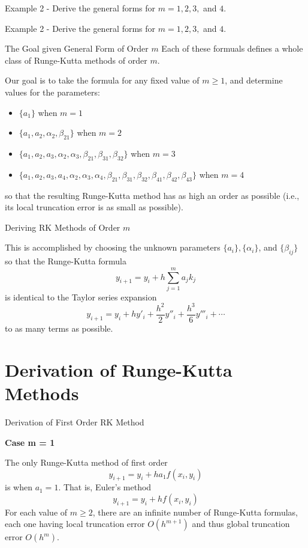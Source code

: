 \documentclass[12pt]{beamer}
\begin{document}
\begin{frame}{Example 2 - Derive the general forms for $m=1,2,3,$ and $4$.}
\end{frame}

\begin{frame}{Example 2 - Derive the general forms for $m=1,2,3,$ and $4$.}
\end{frame}

\begin{frame}{The Goal given General Form of Order $m$} 
Each of these formuals defines a whole class of Runge-Kutta methods of order $m$.

Our goal is to take the formula for any fixed value of $m \geq 1$, and determine values for the parameters:
\begin{itemize}
\item{$\{a_1 \}$ when $m=1$}
\item{$\{a_1,a_2,\alpha_2,\beta_{21} \}$ when $m=2$}
\item{$\{a_1,a_2,a_3,\alpha_2,\alpha_3,\beta_{21},\beta_{31},\beta_{32} \}$ when $m=3$}
\item{$\{a_1,a_2,a_3,a_4,\alpha_2,\alpha_3,\alpha_4,\beta_{21},\beta_{31},\beta_{32},\beta_{41},\beta_{42},\beta_{43} \}$ when $m=4$}
\end{itemize}
so that the resulting Runge-Kutta method has as high an order as possible (i.e., its local truncation error is as small as possible).

\end{frame} 

\begin{frame}{Deriving RK Methods of Order $m$} 

This is accomplished by choosing the unknown parameters $\{a_i\},\{\alpha_i\}$, and $\{\beta_{ij}\}$ so that the Runge-Kutta formula
\[
y_{i+1}=y_i+h\sum_{j=1}^m a_jk_j
\]
is identical to the Taylor series expansion
\[
y_{i+1}=y_i+hy'_i+\frac{h^2}{2}y''_i+\frac{h^3}{6}y'''_i+\dotsm
\]
to as many terms as possible.

\end{frame} 


\section{Derivation of Runge-Kutta Methods}

\begin{frame}{Derivation of First Order RK Method}  

{\bf Case  m = 1}
 
The only Runge-Kutta method of first order 
\[
y_{i+1}=y_i+ha_1f(x_i,y_i)
\]
is when $a_1=1$. That is, Euler’s method
\[
y_{i+1}=y_i+hf(x_i,y_i)
\]
For each value of $m \geq 2$, there are an infinite number of Runge-Kutta formulas, each one having local truncation error $O(h^{m+1})$ and thus global truncation error $O(h^m)$.


\end{frame} 
\end{document}
